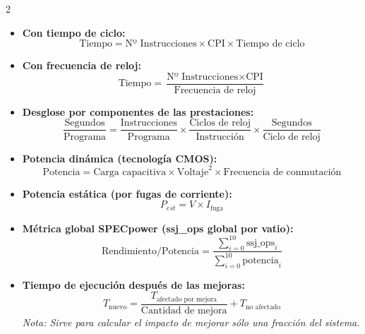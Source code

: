 \documentclass[11pt, a4paper]{article}
\begin{document}
\begin{multicols*}{2}
        \begin{tcolorbox}[
        colback=white, 
        colframe=blue!40!black, 
        title= {\centering \textbf{Ecuación Clásica de las Prestaciones} },
        fonttitle=\bfseries,
        size=small
        ]
        \begin{itemize}
            \item \textbf{Con tiempo de ciclo:}
            $$\text{Tiempo} = \text{Nº Instrucciones} \times \text{CPI} \times \text{Tiempo de ciclo}$$
            \item \textbf{Con frecuencia de reloj:}
            $$\text{Tiempo} = \frac{\text{Nº Instrucciones} \times \text{CPI}}{\text{Frecuencia de reloj}}$$
            \item \textbf{Desglose por componentes de las prestaciones:}
            $$\frac{\text{Segundos}}{\text{Programa}} = \frac{\text{Instrucciones}}{\text{Programa}} \times \frac{\text{Ciclos de reloj}}{\text{Instrucción}} \times \frac{\text{Segundos}}{\text{Ciclo de reloj}}$$
        \end{itemize}
        \end{tcolorbox}

        \vfill\null\columnbreak

        \begin{tcolorbox}[
        colback=white, 
        colframe=blue!40!black, 
        title= {\centering \textbf{Consumo de Potencia} },
        fonttitle=\bfseries,
        size=small
        ]
        \begin{itemize}
            \item \textbf{Potencia dinámica (tecnología CMOS):}
            $$\text{Potencia} = \text{Carga capacitiva} \times \text{Voltaje}^2 \times \text{Frecuencia de conmutación}$$
            \item \textbf{Potencia estática (por fugas de corriente):}
            $$P_{est} = V \times I_{\text{fuga}}$$
            \item \textbf{Métrica global SPECpower (ssj\_ops global por vatio):}
            $$\text{Rendimiento/Potencia} = \frac{\sum_{i=0}^{10} \text{ssj\_ops}_i}{\sum_{i=0}^{10} \text{potencia}_i}$$
        \end{itemize}
        \end{tcolorbox}

        \begin{tcolorbox}[
        colback=white, 
        colframe=blue!40!black, 
        title= {\centering \textbf{Ley de Amdahl} },
        fonttitle=\bfseries,
        size=small
        ]
        \begin{itemize}
            \item \textbf{Tiempo de ejecución después de las mejoras:}
            $$T_{\text{nuevo}} = \frac{T_{\text{afectado por mejora}}}{\text{Cantidad de mejora}} + T_{\text{no afectado}}$$
            \textit{Nota: Sirve para calcular el impacto de mejorar sólo una fracción del sistema.}
        \end{itemize}
        \end{tcolorbox}


\end{multicols*}
\end{document}
